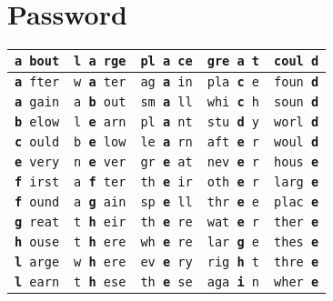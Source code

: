 \documentclass[]{article}
\begin{document}
\section{Password}
\begin{tabular}{|l|l|l|l|l|}
\hline \rule[-1ex]{0pt}{3.5ex} \texttt{\textbf{a} bout} & \texttt{l \textbf{a} rge} & \texttt{pl \textbf{a} ce} & \texttt{gre \textbf{a} t} & \texttt{coul \textbf{d}} \\
\hline \rule[-1ex]{0pt}{3.5ex} \texttt{\textbf{a} fter} & \texttt{w \textbf{a} ter} & \texttt{ag \textbf{a} in} & \texttt{pla \textbf{c} e} & \texttt{foun \textbf{d}} \\
\hline \rule[-1ex]{0pt}{3.5ex} \texttt{\textbf{a} gain} & \texttt{a \textbf{b} out} & \texttt{sm \textbf{a} ll} & \texttt{whi \textbf{c} h} & \texttt{soun \textbf{d}} \\
\hline \rule[-1ex]{0pt}{3.5ex} \texttt{\textbf{b} elow} & \texttt{l \textbf{e} arn} & \texttt{pl \textbf{a} nt} & \texttt{stu \textbf{d} y} & \texttt{worl \textbf{d}} \\
\hline \rule[-1ex]{0pt}{3.5ex} \texttt{\textbf{c} ould} & \texttt{b \textbf{e} low} & \texttt{le \textbf{a} rn} & \texttt{aft \textbf{e} r} & \texttt{woul \textbf{d}} \\
\hline \rule[-1ex]{0pt}{3.5ex} \texttt{\textbf{e} very} & \texttt{n \textbf{e} ver} & \texttt{gr \textbf{e} at} & \texttt{nev \textbf{e} r} & \texttt{hous \textbf{e}} \\
\hline \rule[-1ex]{0pt}{3.5ex} \texttt{\textbf{f} irst} & \texttt{a \textbf{f} ter} & \texttt{th \textbf{e} ir} & \texttt{oth \textbf{e} r} & \texttt{larg \textbf{e}} \\
\hline \rule[-1ex]{0pt}{3.5ex} \texttt{\textbf{f} ound} & \texttt{a \textbf{g} ain} & \texttt{sp \textbf{e} ll} & \texttt{thr \textbf{e} e} & \texttt{plac \textbf{e}} \\
\hline \rule[-1ex]{0pt}{3.5ex} \texttt{\textbf{g} reat} & \texttt{t \textbf{h} eir} & \texttt{th \textbf{e} re} & \texttt{wat \textbf{e} r} & \texttt{ther \textbf{e}} \\
\hline \rule[-1ex]{0pt}{3.5ex} \texttt{\textbf{h} ouse} & \texttt{t \textbf{h} ere} & \texttt{wh \textbf{e} re} & \texttt{lar \textbf{g} e} & \texttt{thes \textbf{e}} \\
\hline \rule[-1ex]{0pt}{3.5ex} \texttt{\textbf{l} arge} & \texttt{w \textbf{h} ere} & \texttt{ev \textbf{e} ry} & \texttt{rig \textbf{h} t} & \texttt{thre \textbf{e}} \\
\hline \rule[-1ex]{0pt}{3.5ex} \texttt{\textbf{l} earn} & \texttt{t \textbf{h} ese} & \texttt{th \textbf{e} se} & \texttt{aga \textbf{i} n} & \texttt{wher \textbf{e}} \\

\end{tabular}
\end{document}
